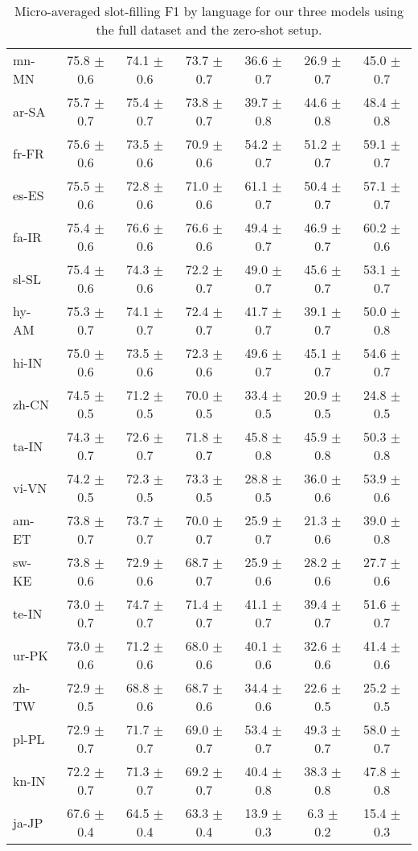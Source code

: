 \documentclass[11pt]{article}
\begin{document}
\begin{table*}[]
{\begin{tabular}{lcccccc}
mn-MN & 75.8 $\pm$ 0.6 & 74.1 $\pm$ 0.6 & 73.7 $\pm$ 0.7 & 36.6 $\pm$ 0.7 & 26.9 $\pm$ 0.7 & 45.0 $\pm$ 0.7 \\
ar-SA & 75.7 $\pm$ 0.7 & 75.4 $\pm$ 0.7 & 73.8 $\pm$ 0.7 & 39.7 $\pm$ 0.8 & 44.6 $\pm$ 0.8 & 48.4 $\pm$ 0.8 \\
fr-FR & 75.6 $\pm$ 0.6 & 73.5 $\pm$ 0.6 & 70.9 $\pm$ 0.6 & 54.2 $\pm$ 0.7 & 51.2 $\pm$ 0.7 & 59.1 $\pm$ 0.7 \\
es-ES & 75.5 $\pm$ 0.6 & 72.8 $\pm$ 0.6 & 71.0 $\pm$ 0.6 & 61.1 $\pm$ 0.7 & 50.4 $\pm$ 0.7 & 57.1 $\pm$ 0.7 \\
fa-IR & 75.4 $\pm$ 0.6 & 76.6 $\pm$ 0.6 & 76.6 $\pm$ 0.6 & 49.4 $\pm$ 0.7 & 46.9 $\pm$ 0.7 & 60.2 $\pm$ 0.6 \\
sl-SL & 75.4 $\pm$ 0.6 & 74.3 $\pm$ 0.6 & 72.2 $\pm$ 0.7 & 49.0 $\pm$ 0.7 & 45.6 $\pm$ 0.7 & 53.1 $\pm$ 0.7 \\
hy-AM & 75.3 $\pm$ 0.7 & 74.1 $\pm$ 0.7 & 72.4 $\pm$ 0.7 & 41.7 $\pm$ 0.7 & 39.1 $\pm$ 0.7 & 50.0 $\pm$ 0.8 \\
hi-IN & 75.0 $\pm$ 0.6 & 73.5 $\pm$ 0.6 & 72.3 $\pm$ 0.6 & 49.6 $\pm$ 0.7 & 45.1 $\pm$ 0.7 & 54.6 $\pm$ 0.7 \\
zh-CN & 74.5 $\pm$ 0.5 & 71.2 $\pm$ 0.5 & 70.0 $\pm$ 0.5 & 33.4 $\pm$ 0.5 & 20.9 $\pm$ 0.5 & 24.8 $\pm$ 0.5 \\
ta-IN & 74.3 $\pm$ 0.7 & 72.6 $\pm$ 0.7 & 71.8 $\pm$ 0.7 & 45.8 $\pm$ 0.8 & 45.9 $\pm$ 0.8 & 50.3 $\pm$ 0.8 \\
vi-VN & 74.2 $\pm$ 0.5 & 72.3 $\pm$ 0.5 & 73.3 $\pm$ 0.5 & 28.8 $\pm$ 0.5 & 36.0 $\pm$ 0.6 & 53.9 $\pm$ 0.6 \\
am-ET & 73.8 $\pm$ 0.7 & 73.7 $\pm$ 0.7 & 70.0 $\pm$ 0.7 & 25.9 $\pm$ 0.7 & 21.3 $\pm$ 0.6 & 39.0 $\pm$ 0.8 \\
sw-KE & 73.8 $\pm$ 0.6 & 72.9 $\pm$ 0.6 & 68.7 $\pm$ 0.7 & 25.9 $\pm$ 0.6 & 28.2 $\pm$ 0.6 & 27.7 $\pm$ 0.6 \\
te-IN & 73.0 $\pm$ 0.7 & 74.7 $\pm$ 0.7 & 71.4 $\pm$ 0.7 & 41.1 $\pm$ 0.7 & 39.4 $\pm$ 0.7 & 51.6 $\pm$ 0.7 \\
ur-PK & 73.0 $\pm$ 0.6 & 71.2 $\pm$ 0.6 & 68.0 $\pm$ 0.6 & 40.1 $\pm$ 0.6 & 32.6 $\pm$ 0.6 & 41.4 $\pm$ 0.6 \\
zh-TW & 72.9 $\pm$ 0.5 & 68.8 $\pm$ 0.6 & 68.7 $\pm$ 0.6 & 34.4 $\pm$ 0.6 & 22.6 $\pm$ 0.5 & 25.2 $\pm$ 0.5 \\
pl-PL & 72.9 $\pm$ 0.7 & 71.7 $\pm$ 0.7 & 69.0 $\pm$ 0.7 & 53.4 $\pm$ 0.7 & 49.3 $\pm$ 0.7 & 58.0 $\pm$ 0.7 \\
kn-IN & 72.2 $\pm$ 0.7 & 71.3 $\pm$ 0.7 & 69.2 $\pm$ 0.7 & 40.4 $\pm$ 0.8 & 38.3 $\pm$ 0.8 & 47.8 $\pm$ 0.8 \\
ja-JP & 67.6 $\pm$ 0.4 & 64.5 $\pm$ 0.4 & 63.3 $\pm$ 0.4 & 13.9 $\pm$ 0.3 & 6.3 $\pm$ 0.2 & 15.4 $\pm$ 0.3 \\
\bottomrule
\end{tabular}
}
\caption{Micro-averaged slot-filling F1 by language for our three models using the full dataset and the zero-shot setup.}
\label{tab:all_slot_f1}
\end{table*}
\end{document}
